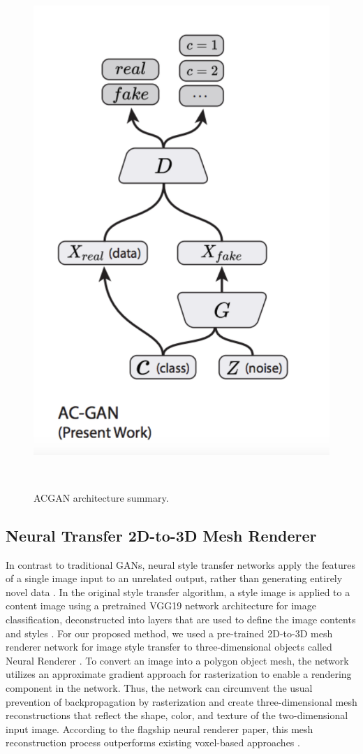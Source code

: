 \documentclass{sigchi}
\begin{document}
\begin{figure}
\centering
  \includegraphics[width=0.75\columnwidth]{figures/ACGAN}
  \caption{ACGAN architecture summary.}~\label{fig:figure3}
\end{figure}

\subsection{Neural Transfer 2D-to-3D Mesh Renderer}
In contrast to traditional GANs, neural style transfer networks apply the features of a single image input to an unrelated output, rather than generating entirely novel data \cite{neuraltrans}. In the original style transfer algorithm, a style image is applied to a content image using a pretrained VGG19 network architecture for image classification, deconstructed into layers that are used to define the image contents and styles \cite{neuraltrans}. For our proposed method, we used a pre-trained 2D-to-3D mesh renderer network for image style transfer \cite{DBLP:journals/corr/abs-1711-07566}to three-dimensional objects called Neural Renderer \cite{DBLP:journals/corr/abs-1711-07566}. To convert an image into a polygon object mesh, the network utilizes an approximate gradient approach for rasterization to enable a rendering component in the network. Thus, the network can circumvent the usual prevention of backpropagation by rasterization and create three-dimensional mesh reconstructions that reflect the shape, color, and texture of the two-dimensional input image. According to the flagship neural renderer paper, this mesh reconstruction process outperforms existing voxel-based approaches \cite{DBLP:journals/corr/abs-1711-07566}.
\end{document}
